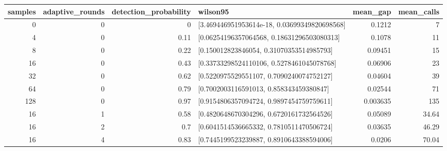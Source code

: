 \begin{tabular}{rrrlrr}
\toprule
samples & adaptive\_rounds & detection\_probability & wilson95 & mean\_gap & mean\_calls \\
\midrule
0 & 0 & 0 & [3.469446951953614e-18, 0.03699349820698568] & 0.1212 & 7 \\
4 & 0 & 0.11 & [0.06254196357064568, 0.18631296503080313] & 0.1078 & 11 \\
8 & 0 & 0.22 & [0.150012823846054, 0.31070353514985793] & 0.09451 & 15 \\
16 & 0 & 0.43 & [0.33733298524110106, 0.5278461045078768] & 0.06906 & 23 \\
32 & 0 & 0.62 & [0.5220975529551107, 0.7090240074752127] & 0.04604 & 39 \\
64 & 0 & 0.79 & [0.7002003116591013, 0.858343459380847] & 0.02544 & 71 \\
128 & 0 & 0.97 & [0.9154806357094724, 0.9897454759759611] & 0.003635 & 135 \\
16 & 1 & 0.58 & [0.4820648670304296, 0.6720161732564526] & 0.05089 & 34.64 \\
16 & 2 & 0.7 & [0.6041514536665332, 0.7810511470506724] & 0.03635 & 46.29 \\
16 & 4 & 0.83 & [0.7445199523239887, 0.8910643388594006] & 0.0206 & 70.04 \\
\bottomrule
\end{tabular}
